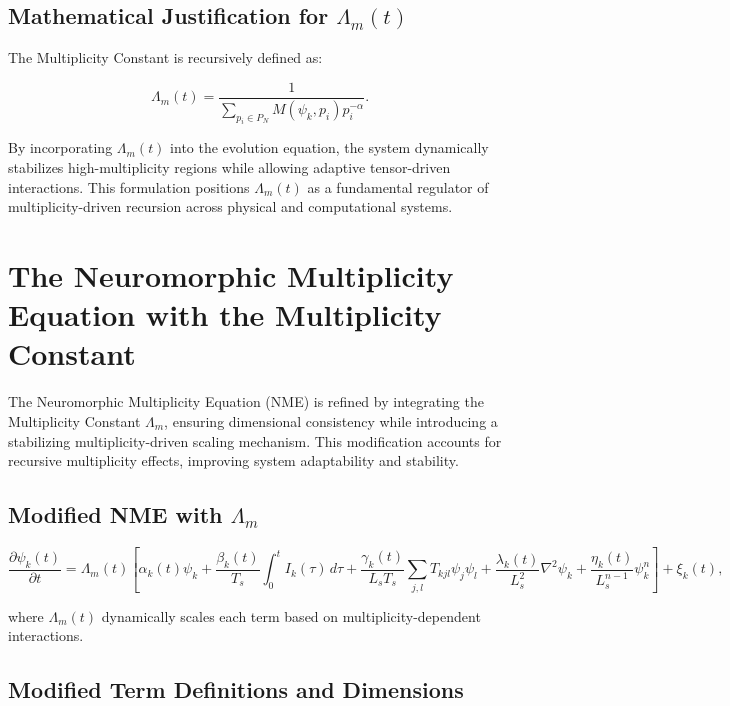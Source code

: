 \documentclass{article}
\theoremstyle{plain}
\begin{document}
\subsection{Mathematical Justification for \( \Lambda_m(t) \)}

The Multiplicity Constant is recursively defined as:

\begin{equation}
\Lambda_m(t) = \frac{1}{\sum_{p_i \in P_N} M(\psi_k, p_i) p_i^{-\alpha}}.
\end{equation}

By incorporating \( \Lambda_m(t) \) into the evolution equation, the system dynamically stabilizes high-multiplicity regions while allowing adaptive tensor-driven interactions. This formulation positions \( \Lambda_m(t) \) as a fundamental regulator of multiplicity-driven recursion across physical and computational systems.


\section{The Neuromorphic Multiplicity Equation with the Multiplicity Constant}

The Neuromorphic Multiplicity Equation (NME) is refined by integrating the Multiplicity Constant \( \Lambda_m \), ensuring dimensional consistency while introducing a stabilizing multiplicity-driven scaling mechanism. This modification accounts for recursive multiplicity effects, improving system adaptability and stability.

\subsection{Modified NME with \( \Lambda_m \)}

\begin{equation}
\frac{\partial \psi_k(t)}{\partial t} = \Lambda_m(t) \left[ \alpha_k(t) \psi_k + \frac{\beta_k(t)}{T_s} \int_0^t I_k(\tau) \, d\tau + \frac{\gamma_k(t)}{L_s T_s} \sum_{j,l} T_{kjl} \psi_j \psi_l + \frac{\lambda_k(t)}{L_s^2} \nabla^2 \psi_k + \frac{\eta_k(t)}{L_s^{n-1}} \psi_k^n \right] + \xi_k(t),
\end{equation}

where \( \Lambda_m(t) \) dynamically scales each term based on multiplicity-dependent interactions.

\subsection{Modified Term Definitions and Dimensions}
\end{document}
